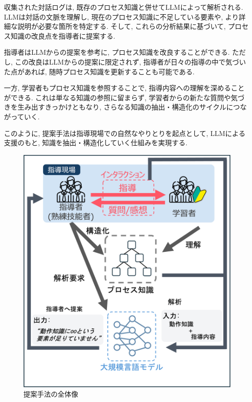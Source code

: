 収集された対話ログは, 既存のプロセス知識と併せてLLMによって解析される. LLMは対話の文脈を理解し, 現在のプロセス知識に不足している要素や, より詳細な説明が必要な箇所を特定する. そして, これらの分析結果に基づいて, プロセス知識の改良点を指導者に提案する. 

指導者はLLMからの提案を参考に, プロセス知識を改良することができる. ただし, この改良はLLMからの提案に限定されず, 指導者が日々の指導の中で気づいた点があれば, 随時プロセス知識を更新することも可能である. 

一方, 学習者もプロセス知識を参照することで, 指導内容への理解を深めることができる. これは単なる知識の参照に留まらず, 学習者からの新たな質問や気づきを生み出すきっかけともなり, さらなる知識の抽出・構造化のサイクルにつながっていく. 

このように, 提案手法は指導現場での自然なやりとりを起点として, LLMによる支援のもと, 知識を抽出・構造化していく仕組みを実現する. 

\begin{figure}[htbp]
    \centering
    \includegraphics[width=1.0\linewidth]{./image/overview_2.png}
    \caption{提案手法の全体像}
    \label{fig1}
\end{figure}
